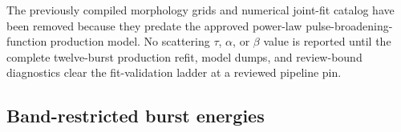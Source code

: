 %
%
%

The previously compiled morphology grids and numerical joint-fit catalog have
been removed because they predate the approved power-law
pulse-broadening-function production model. No scattering $\tau$, $\alpha$, or
$\beta$ value is reported until the complete twelve-burst production refit,
model dumps, and review-bound diagnostics clear the fit-validation ladder at a
reviewed pipeline pin.

\FloatBarrier
\subsection{Band-restricted burst energies}
\label{sec:burst-energies}


